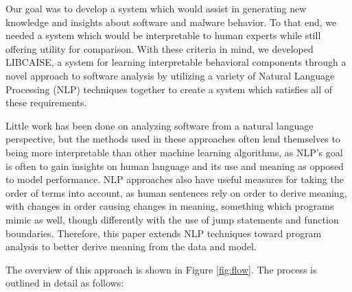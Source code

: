 Our goal was to develop a system which would assist in generating new knowledge and insights about software and malware behavior. To that end, we needed a system which would be interpretable to human experts while still offering utility for comparison. With these criteria in mind, we developed LIBCAISE, a system for learning interpretable behavioral components through a novel approach to software analysis by utilizing a variety of Natural Language Processing (NLP) techniques together to create a system which satisfies all of these requirements. 

Little work has been done on analyzing software from a natural language perspective, but the methods used in these approaches often lend themselves to being more interpretable than other machine learning algorithms, as NLP's goal is often to gain insights on human language and its use and meaning as opposed to model performance. NLP approaches also have useful measures for taking the order of terms into account, as human sentences rely on order to derive meaning, with changes in order causing changes in meaning, something which programs mimic as well, though differently with the use of jump statements and function boundaries. Therefore, this paper extends NLP techniques toward program analysis to better derive meaning from the data and model.

The overview of this approach is shown in Figure \ref{fig:flow}. The process is outlined in detail as follows:

